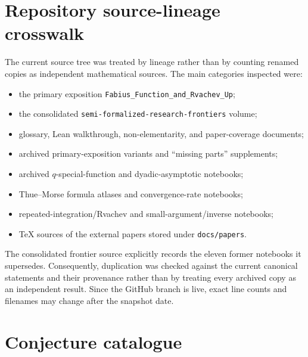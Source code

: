 \documentclass[11pt,oneside]{article}
\theoremstyle{definition}
\theoremstyle{remark}
\begin{document}
\section{Repository source-lineage crosswalk}

The current source tree was treated by lineage rather than by counting renamed copies as independent mathematical sources.  The main categories inspected were:
\begin{itemize}
  \item the primary exposition \texttt{Fabius\_Function\_and\_Rvachev\_Up};
  \item the consolidated \texttt{semi-formalized-research-frontiers} volume;
  \item glossary, Lean walkthrough, non-elementarity, and paper-coverage documents;
  \item archived primary-exposition variants and ``missing parts'' supplements;
  \item archived $q$-special-function and dyadic-asymptotic notebooks;
  \item Thue--Morse formula atlases and convergence-rate notebooks;
  \item repeated-integration/Rvachev and small-argument/inverse notebooks;
  \item TeX sources of the external papers stored under \texttt{docs/papers}.
\end{itemize}
The consolidated frontier source explicitly records the eleven former notebooks it supersedes.  Consequently, duplication was checked against the current canonical statements and their provenance rather than by treating every archived copy as an independent result.  Since the GitHub branch is live, exact line counts and filenames may change after the snapshot date.

\section{Conjecture catalogue}
\end{document}
